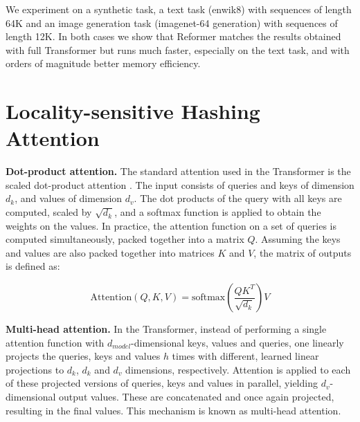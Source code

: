 \documentclass{article} \usepackage{iclr2020_conference,times}
\renewcommand{\paragraph}[1]{\textbf{#1}}
\begin{document}
We experiment on a synthetic task, a text task (enwik8) with sequences of length 64K and an image generation task (imagenet-64 generation)
with sequences of length 12K. In both cases we show that Reformer matches the results obtained with full Transformer
but runs much faster, especially on the text task, and with orders of magnitude better memory efficiency.

\section{Locality-sensitive Hashing Attention}

\paragraph{Dot-product attention.}
The standard attention used in the Transformer is the scaled dot-product attention \citep{transformer}. 
The input consists of queries and keys of dimension $d_k$, and values of dimension $d_v$.  
The dot products of the query with all keys are computed, scaled by $\sqrt{d_k}$, and a softmax function is 
applied to obtain the weights on the values. In practice, the attention function on a set of queries is computed 
simultaneously, packed together into a matrix $Q$.  Assuming the keys and values are also packed together into 
matrices $K$ and $V$, the matrix of outputs is defined as:

\begin{equation}\label{eq:attn}
   \mathrm{Attention}(Q, K, V) = \mathrm{softmax}(\frac{QK^T}{\sqrt{d_k}})V
\end{equation}

\paragraph{Multi-head attention.}
In the Transformer, instead of performing a single attention function with $d_{model}$-dimensional keys, 
values and queries, one linearly projects the queries, keys and values $h$ times with different, 
learned linear projections to $d_k$, $d_k$ and $d_v$ dimensions, respectively.  Attention is applied to 
each of these projected versions of queries, keys and values in parallel, yielding $d_v$-dimensional 
output values. These are concatenated and once again projected, resulting in the final values. This 
mechanism is known as multi-head attention.
\end{document}
